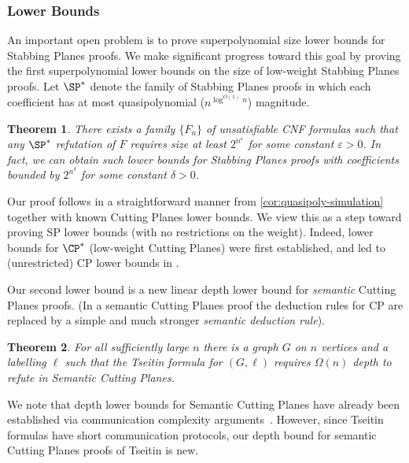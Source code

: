 \documentclass[11pt]{article}
\newtheorem{theorem}{Theorem}[section]
\begin{document}
\subsubsection{Lower Bounds} 
An important open problem is to prove superpolynomial size lower bounds for Stabbing Planes proofs.
We make significant progress toward this goal by proving the first superpolynomial lower bounds
on the size of low-weight Stabbing Planes proofs.
Let $\SP^*$ denote the family of Stabbing Planes proofs in which each coefficient has at most quasipolynomial ($n^{\log^{O(1)} n}$) magnitude.
%

\begin{theorem}\label{thm:spstar-lb}
There exists a family %
%
$\{F_n\}$ of unsatisfiable CNF formulas  %
such that any $\SP^*$ refutation of $F$ requires size at least $2^{n^\varepsilon}$ for
some %
constant $\varepsilon > 0$. In fact, we can obtain such lower bounds for Stabbing Planes proofs with coefficients bounded by $2^{n^\delta}$ for some constant $\delta>0$.
\end{theorem}

Our proof follows in a straightforward manner from \autoref{cor:quasipoly-simulation} together with known Cutting Planes lower bounds.
We view this as a step toward proving SP lower bounds (with no restrictions on the weight).
Indeed, lower bounds for $\CP^*$ (low-weight Cutting Planes) \cite{BonetPR97} were first established, and led to (unrestricted) CP lower bounds
in %
\cite{Pudlak97}. 


Our second lower bound is a new linear depth lower bound for \emph{semantic}
Cutting Planes proofs.
(In a semantic Cutting Planes proof the deduction rules for CP are replaced by
a simple and much stronger \emph{semantic deduction rule}).
%
%

\begin{theorem}
\label{depth-lb}
   For all sufficiently large $n$ there is a graph $G$ on $n$ vertices and a labelling $\ell$ such that the Tseitin formula for $(G, \ell)$ requires $\Omega(n)$ depth to refute in Semantic Cutting Planes.
\end{theorem}


%
We note that depth lower bounds for Semantic Cutting Planes have already
been  %
established  %
%
via communication complexity arguments~\cite{ipu:cp}.  %
However, since Tseitin formulas have short communication protocols,
our depth bound for semantic Cutting Planes proofs of Tseitin is new.
%
%
\end{document}
